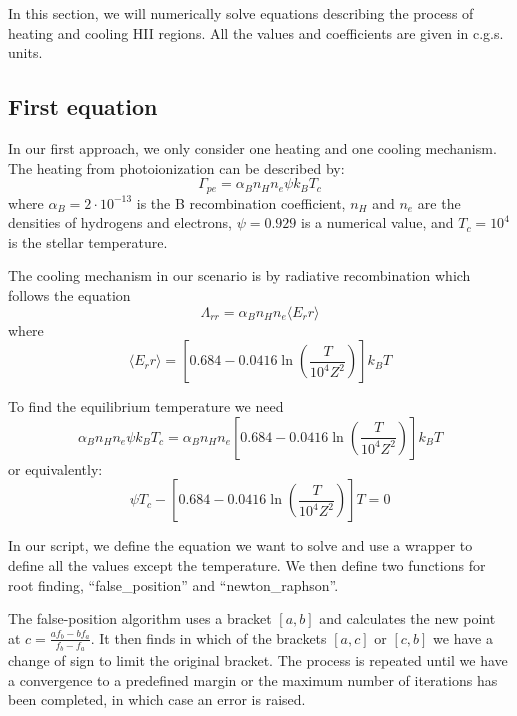 \documentclass[a4paper,10pt]{article}
\begin{document}
In this section, we will numerically solve equations describing the process of heating and cooling HII regions. All the values and coefficients are given in c.g.s. units.

\subsection{First equation}

In our first approach, we only consider one heating and one cooling mechanism. The heating from photoionization can be described by:
\begin{equation}
  \Gamma_{pe}=\alpha_B n_H n_e \psi k_B T_c
\end{equation}
where $\alpha_B=2 \cdot 10^{-13}$ is the B recombination coefficient, $n_H$ and $n_e$ are the densities of hydrogens and electrons, $\psi=0.929$ is a numerical value, and $T_c=10^4$ is the stellar temperature.

The cooling mechanism in our scenario is by radiative recombination which follows the equation
\begin{equation}
  \Lambda_{rr}=\alpha_B n_H n_e \langle E_rr \rangle
\end{equation}
where 
\begin{equation}
  \langle E_rr \rangle = \left[0.684-0.0416 \ln\left(\frac{T}{10^4 Z^2}\right)\right]k_B T
\end{equation}

To find the equilibrium temperature we need
\begin{equation}
  \alpha_B n_H n_e \psi k_B T_c = \alpha_B n_H n_e \left[0.684-0.0416 \ln\left(\frac{T}{10^4 Z^2}\right)\right]k_B T
\end{equation}
or equivalently:
\begin{equation}
  \psi T_c - \left[0.684-0.0416 \ln\left(\frac{T}{10^4 Z^2}\right)\right] T = 0
\end{equation}

In our script, we define the equation we want to solve and use a wrapper to define all the values except the temperature. We then define two functions for root finding, ``false\_position'' and ``newton\_raphson''.

The false-position algorithm uses a bracket $[a,b]$ and calculates the new point at $c=\frac{a f_b-b f_a}{f_b-f_a}$. It then finds in which of the brackets $[a,c]$ or $[c,b]$ we have a change of sign to limit the original bracket. The process is repeated until we have a convergence to a predefined margin or the maximum number of iterations has been completed, in which case an error is raised. 
\end{document}
